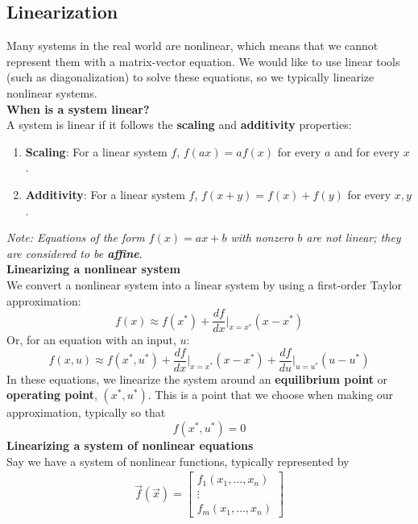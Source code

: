 \subsection*{Linearization}
Many systems in the real world are nonlinear, which means that we cannot represent them with a matrix-vector equation. 
We would like to use linear tools (such as diagonalization) to solve these equations, so we typically linearize nonlinear systems. \\
\newline
\textbf{When is a system linear?} \\
\newline
A system is linear if it follows the \textbf{scaling} and \textbf{additivity} properties:
\begin{enumerate}
    \item \textbf{Scaling}: For a linear system $f$, $\boxed{f(ax) = af(x)}$ for every $a$ and for every $x$.
    \item \textbf{Additivity}: For a linear system $f$, $\boxed{f(x + y) = f(x) + f(y)}$ for every $x, y$.
\end{enumerate}
\textit{Note: Equations of the form $f(x) = ax + b$ with nonzero $b$ are not linear; they are considered to be \textbf{affine}}. \\
\newline
\textbf{Linearizing a nonlinear system} \\
\newline
We convert a nonlinear system into a linear system by using a first-order Taylor approximation:
$$\boxed{f(x) \approx f(x^*) + \frac{df}{dx} \bigg\rvert_{x = x^*} (x - x^*)}$$
Or, for an equation with an input, $u$:
$$\boxed{f(x, u) \approx f(x^*, u^*) + \frac{df}{dx} \bigg\rvert_{x = x^*} (x - x^*) + \frac{df}{du} \bigg\rvert_{u = u^*} (u - u^*)}$$
In these equations, we linearize the system around an \textbf{equilibrium point} or \textbf{operating point}, $(x^*, u^*)$. 
This is a point that we choose when making our approximation, typically so that
$$f(x^*, u^*) = 0$$
\newline
\textbf{Linearizing a system of nonlinear equations} \\
\newline
Say we have a system of nonlinear functions, typically represented by
\begin{align*}
    \vec{f}(\vec{x}) = \begin{bmatrix}
        f_1(x_1, \dots, x_n) \\
        \vdots \\
        f_m(x_1, \dots, x_n)
    \end{bmatrix}
\end{align*}
